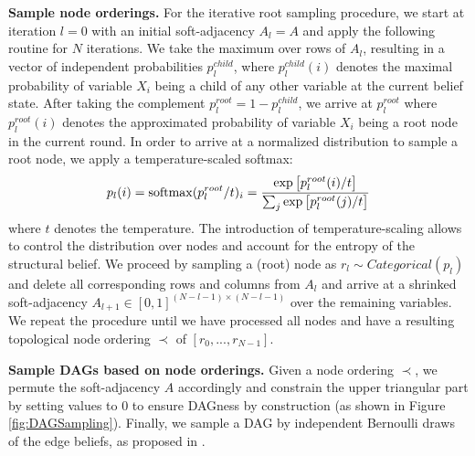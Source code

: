 \documentclass[nohyperref]{article}
\theoremstyle{plain}
\theoremstyle{definition}
\theoremstyle{remark}
\begin{document}
\vspace{-1mm}
\textbf{Sample node orderings.} For the iterative root sampling procedure, we start at iteration $l=0$ with an initial soft-adjacency $A_l = A$ and apply the following routine for $N$ iterations. We take the maximum over rows of $A_l$, resulting in a vector of independent probabilities $p_l^{child}$, where $p_l^{child}(i)$ denotes the maximal probability of variable $X_i$ being a child of any other variable at the current belief state. After taking the complement $p_l^{root} = 1-p_l^{child}$, we arrive at $p_l^{root}$ where $p_l^{root}(i)$ denotes the approximated probability of variable $X_i$ being a root node in the current round. In order to arrive at a normalized distribution to sample a root node, we apply a temperature-scaled softmax:
\vspace{-1mm}
\[
\small
    p_l(i) = \mathrm{softmax}(p_l^{root}/t)_i = \frac{\exp\big[p_l^{root}(i)/t\big]}{\sum_{j}^{ }\exp\big[p_l^{root}(j)/t\big]}
\]
where $t$ denotes the temperature. The introduction of temperature-scaling allows to control the distribution over nodes and account for the entropy of the structural belief. We proceed by sampling a (root) node as $r_l \sim Categorical(p_l)$ and delete all corresponding rows and columns from $A_l$ and arrive at a shrinked soft-adjacency $A_{l+1} \in [0,1]^{(N-l-1) \times (N-l-1)}$ over the remaining variables. We repeat the procedure until we have processed all nodes and have a resulting topological node ordering $\prec$ of $[r_0, ..., r_{N-1}]$.

\textbf{Sample DAGs based on node orderings.} Given a node ordering $\prec$, we permute the soft-adjacency $A$ accordingly and constrain the upper triangular part by setting values to $0$ to ensure DAGness by construction (as shown in Figure \ref{fig:DAGSampling}). Finally, we sample a DAG by independent Bernoulli draws of the edge beliefs, as proposed in \citet{ke2019learning}. 






\end{document}
